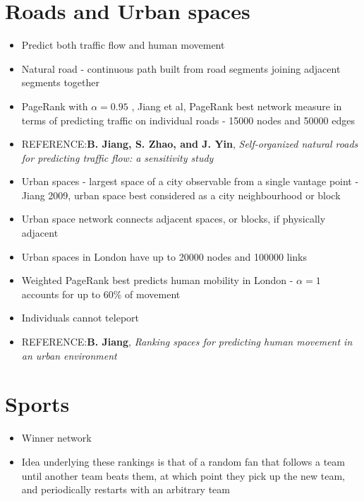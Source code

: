 \documentclass[11pt]{report}
\begin{document}
\section{Roads and Urban spaces}
\begin{itemize}
\item Predict both traffic flow and human movement
\item Natural road - continuous path built from road segments joining adjacent segments together
\item PageRank with $\alpha=0.95$ , Jiang et al, PageRank best network measure in terms of predicting traffic on individual roads - 15000 nodes and 50000 edges
\item REFERENCE:\textbf{B. Jiang, S. Zhao, and J. Yin}, \textit{Self-organized natural roads for predicting traffic flow: a sensitivity
study}
\item Urban spaces - largest space of a city observable from a single vantage point - Jiang 2009, urban space best considered as a city neighbourhood or block
\item Urban space network connects adjacent spaces, or blocks, if physically adjacent
\item Urban spaces in London have up to 20000 nodes and 100000 links
\item Weighted PageRank best predicts human mobility in London - $\alpha=1$ accounts for up to 60\% of movement
\item Individuals cannot teleport
\item REFERENCE:\textbf{B. Jiang}, \textit{Ranking spaces for predicting human movement in an urban environment}
\end{itemize}
\section{Sports}
\begin{itemize}
\item Winner network
\item Idea underlying these rankings is that of a random fan that follows a team until another team beats them, at which point they pick up the new team, and periodically restarts with an arbitrary team
\end{itemize}
\end{document}
